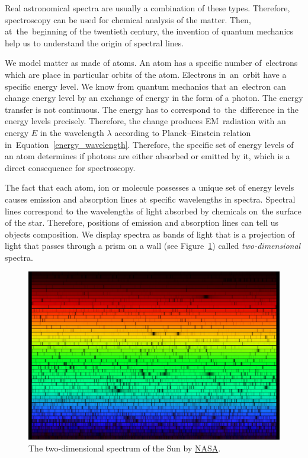 Real astronomical spectra are usually a combination of these types.
Therefore, spectroscopy can be used for chemical analysis of the matter.
Then, at~the~beginning of the twentieth century,
the invention of quantum mechanics help us to understand the origin of spectral lines.

We model matter as made of atoms.
An atom has a specific number of~electrons which are place in particular orbits of the atom.
Electrons in~an~orbit have a specific energy level.
We know from quantum mechanics that an~electron can change energy level by an exchange of energy in the form of a photon.
The energy transfer is not continuous.
The energy has to correspond to~the~difference in the energy levels precisely.
Therefore, the change produces EM~radiation with an energy \(E\) in the wavelength \(\lambda\)
according to Planck--Einstein relation in~Equation~\ref{energy_wavelength}.
Therefore, the specific set of energy levels of an atom determines
if photons are either absorbed or emitted by it,
which is a direct consequence for spectroscopy.~\cite{cochard2018}

The fact that each atom, ion or molecule possesses a unique set of energy levels
causes emission and absorption lines at specific wavelengths in spectra.
Spectral lines correspond to the wavelengths of light absorbed by chemicals on~the surface of the star.
Therefore, positions of emission and absorption lines can tell us objects composition.
We display spectra as bands of light that is a projection of light
that passes through a prism on a wall (see Figure~\ref{solar_spectrum})
called \textit{two-dimensional} spectra.~\cite{cochard2018}

\begin{figure}
\includegraphics[width=\textwidth]{img/solarspectrum.jpg}
\caption[Two-dimensional Solar spectrum]{
	The two-dimensional spectrum of the Sun by \href{https://solarsystem.nasa.gov/resources/390/the-solar-spectrum/}{NASA}.
}
\label{solar_spectrum}
\end{figure}

